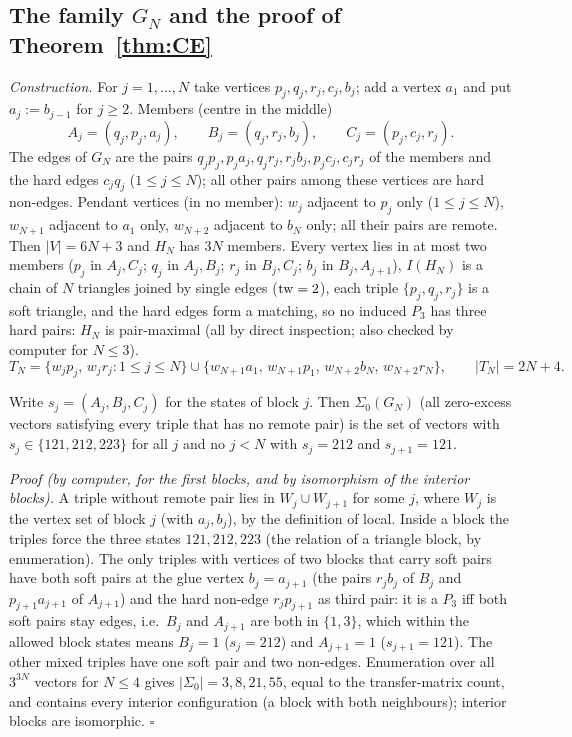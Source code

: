 \subsection{The family \texorpdfstring{$G_N$}{G\_N} and the proof of Theorem~\ref{thm:CE}}\label{app:softCE}
\emph{Construction.} For $j=1,\dots,N$ take vertices $p_j,q_j,r_j,c_j,b_j$; add a vertex $a_1$ and put $a_j:=b_{j-1}$ for $j\ge2$. Members (centre in the middle)
\[A_j=(q_j,p_j,a_j),\qquad B_j=(q_j,r_j,b_j),\qquad C_j=(p_j,c_j,r_j).\]
The edges of $G_N$ are the pairs $q_jp_j,p_ja_j,q_jr_j,r_jb_j,p_jc_j,c_jr_j$ of the members and the hard edges $c_jq_j$ ($1\le j\le N$); all other pairs among these vertices are hard non-edges. Pendant vertices (in no member): $w_j$ adjacent to $p_j$ only ($1\le j\le N$), $w_{N+1}$ adjacent to $a_1$ only, $w_{N+2}$ adjacent to $b_N$ only; all their pairs are remote. Then $|V|=6N+3$ and $H_N$ has $3N$ members. Every vertex lies in at most two members ($p_j$ in $A_j,C_j$; $q_j$ in $A_j,B_j$; $r_j$ in $B_j,C_j$; $b_j$ in $B_j,A_{j+1}$), $I(H_N)$ is a chain of $N$ triangles joined by single edges ($\mathrm{tw}=2$), each triple $\{p_j,q_j,r_j\}$ is a soft triangle, and the hard edges form a matching, so no induced $P_3$ has three hard pairs: $H_N$ is pair-maximal (all by direct inspection; also checked by computer for $N\le3$).
\[T_N=\{w_jp_j,\,w_jr_j:1\le j\le N\}\cup\{w_{N+1}a_1,\,w_{N+1}p_1,\,w_{N+2}b_N,\,w_{N+2}r_N\},\qquad|T_N|=2N+4.\]

\begin{lemma}[Structure]\label{lem:GN}
Write $s_j=(A_j,B_j,C_j)$ for the states of block $j$. Then $\Sigma_0(G_N)$ (all zero-excess vectors satisfying every triple that has no remote pair) is the set of vectors with $s_j\in\{121,212,223\}$ for all $j$ and no $j<N$ with $s_j=212$ and $s_{j+1}=121$.
\end{lemma}
\emph{Proof (by computer, for the first blocks, and by isomorphism of the interior blocks).} A triple without remote pair lies in $W_j\cup W_{j+1}$ for some $j$, where $W_j$ is the vertex set of block $j$ (with $a_j,b_j$), by the definition of local. Inside a block the triples force the three states $121,212,223$ (the relation of a triangle block, by enumeration). The only triples with vertices of two blocks that carry soft pairs have both soft pairs at the glue vertex $b_j=a_{j+1}$ (the pairs $r_jb_j$ of $B_j$ and $p_{j+1}a_{j+1}$ of $A_{j+1}$) and the hard non-edge $r_jp_{j+1}$ as third pair: it is a $P_3$ iff both soft pairs stay edges, i.e.\ $B_j$ and $A_{j+1}$ are both in $\{1,3\}$, which within the allowed block states means $B_j=1$ ($s_j=212$) and $A_{j+1}=1$ ($s_{j+1}=121$). The other mixed triples have one soft pair and two non-edges. Enumeration over all $3^{3N}$ vectors for $N\le4$ gives $|\Sigma_0|=3,8,21,55$, equal to the transfer-matrix count, and contains every interior configuration (a block with both neighbours); interior blocks are isomorphic. \hfill$\square$

